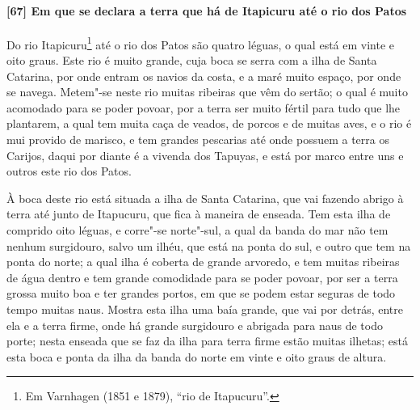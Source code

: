 \paragraph{[67] Em que se declara a terra que há de Itapicuru até o rio dos Patos} \quad
Do rio Itapicuru\footnote{ Em Varnhagen (1851 e 1879), ``rio de Itapucuru''.} até o rio
dos Patos são quatro léguas, o qual está em vinte e oito graus. Este rio é muito grande,
cuja boca se serra com a ilha de Santa Catarina, por onde entram os navios da costa, e a
maré muito espaço, por onde se navega. Metem"-se neste rio muitas ribeiras que vêm do
sertão; o qual é muito acomodado para se poder povoar, por a terra ser muito fértil para
tudo que lhe plantarem, a qual tem muita caça de veados, de porcos e de muitas aves, e o
rio é mui provido de marisco, e tem grandes pescarias até onde possuem a terra os Carijos,
daqui por diante é a vivenda dos Tapuyas, e está por marco entre uns e outros este rio dos
Patos.

À boca deste rio está situada a ilha de Santa Catarina, que vai fazendo abrigo à terra até
junto de Itapucuru, que fica à maneira de enseada. Tem esta ilha de comprido oito léguas,
e corre"-se norte"-sul, a qual da banda do mar não tem nenhum surgidouro, salvo um ilhéu,
que está na ponta do sul, e outro que tem na ponta do norte; a qual ilha é coberta de
grande arvoredo, e tem muitas ribeiras de água dentro e tem grande comodidade para se
poder povoar, por ser a terra grossa muito boa e ter grandes portos, em que se podem estar
seguras de todo tempo muitas naus. Mostra esta ilha uma baía grande, que vai por detrás,
entre ela e a terra firme, onde há grande surgidouro e abrigada para naus de todo porte;
nesta enseada que se faz da ilha para terra firme estão muitas ilhetas; está esta boca e
ponta da ilha da banda do norte em vinte e oito graus de altura.

